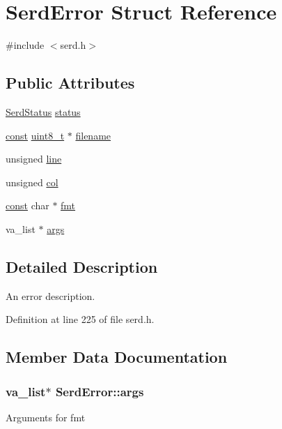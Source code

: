 \hypertarget{struct_serd_error}{}\section{Serd\+Error Struct Reference}
\label{struct_serd_error}


{\ttfamily \#include $<$serd.\+h$>$}

\subsection*{Public Attributes}
\begin{DoxyCompactItemize}
\item 
\hyperlink{group__serd_ga104d544e48b6282ef2447bb3ac7c330d}{Serd\+Status} \hyperlink{struct_serd_error_ad24bd4cffdaeacbe833b20ded1e81e4c}{status}
\item 
\hyperlink{getopt1_8c_a2c212835823e3c54a8ab6d95c652660e}{const} \hyperlink{lib-src_2ffmpeg_2win32_2stdint_8h_a9a941819355e6f658991890ff66b4b0e}{uint8\+\_\+t} $\ast$ \hyperlink{struct_serd_error_a7ce492ac3be5bf5dae7394edd260bc79}{filename}
\item 
unsigned \hyperlink{struct_serd_error_af168bcd27bcecea6a3560195cebca4d8}{line}
\item 
unsigned \hyperlink{struct_serd_error_aa44d03c985deafe03b6c6e9b2241aebe}{col}
\item 
\hyperlink{getopt1_8c_a2c212835823e3c54a8ab6d95c652660e}{const} char $\ast$ \hyperlink{struct_serd_error_a79ca1a8093c602b5c8a2aa21aa711e0a}{fmt}
\item 
va\+\_\+list $\ast$ \hyperlink{struct_serd_error_ad887f45444a7531e0507fb19651db0f3}{args}
\end{DoxyCompactItemize}


\subsection{Detailed Description}
An error description. 

Definition at line 225 of file serd.\+h.



\subsection{Member Data Documentation}
\subsubsection[{\texorpdfstring{args}{args}}]{\setlength{\rightskip}{0pt plus 5cm}va\+\_\+list$\ast$ Serd\+Error\+::args}\hypertarget{struct_serd_error_ad887f45444a7531e0507fb19651db0f3}{}\label{struct_serd_error_ad887f45444a7531e0507fb19651db0f3}
Arguments for fmt 

